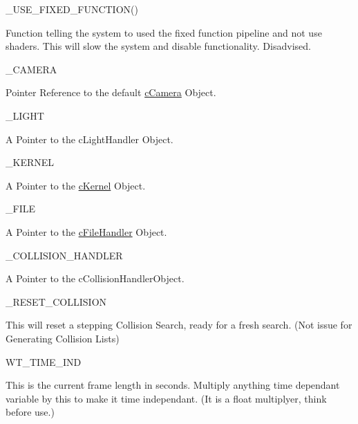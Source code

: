 \begin{DoxyItemize}
\item \_\-USE\_\-FIXED\_\-FUNCTION()
\begin{DoxyItemize}
\item Function telling the system to used the fixed function pipeline and not use shaders. This will slow the system and disable functionality. Disadvised.
\end{DoxyItemize}
\item \_\-CAMERA
\begin{DoxyItemize}
\item Pointer Reference to the default \hyperlink{classc_camera}{cCamera} Object.
\end{DoxyItemize}
\item \_\-LIGHT
\begin{DoxyItemize}
\item A Pointer to the cLightHandler Object.
\end{DoxyItemize}
\item \_\-KERNEL
\begin{DoxyItemize}
\item A Pointer to the \hyperlink{classc_kernel}{cKernel} Object.
\end{DoxyItemize}
\item \_\-FILE
\begin{DoxyItemize}
\item A Pointer to the \hyperlink{classc_file_handler}{cFileHandler} Object.
\end{DoxyItemize}
\item \_\-COLLISION\_\-HANDLER
\begin{DoxyItemize}
\item A Pointer to the cCollisionHandlerObject.
\end{DoxyItemize}
\item \_\-RESET\_\-COLLISION
\begin{DoxyItemize}
\item This will reset a stepping Collision Search, ready for a fresh search. (Not issue for Generating Collision Lists)
\end{DoxyItemize}
\item WT\_\-TIME\_\-IND
\begin{DoxyItemize}
\item This is the current frame length in seconds. Multiply anything time dependant variable by this to make it time independant. (It is a float multiplyer, think before use.)\par


\end{DoxyItemize}
\end{DoxyItemize}
